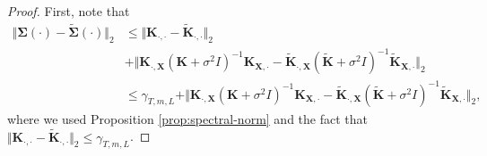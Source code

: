 \begin{proof}
    


First, note that
\begin{align*}
    \Vert \boldsymbol{\Sigma}(\cdot)-\tilde{\boldsymbol{\Sigma}}(\cdot)\Vert_2 &\leq \Vert \textbf{K}_{\cdot,\cdot}-\tilde{\textbf{K}}_{\cdot,\cdot}\Vert_2\\
    &+ \Vert \textbf{K}_{\cdot,\textbf{X}} (\textbf{K}+\sigma^2 I)^{-1}\textbf{K}_{\textbf{X},\cdot}-\tilde{\textbf{K}}_{\cdot,\textbf{X}} (\tilde{\textbf{K}}+\sigma^2 I)^{-1}\tilde{\textbf{K}}_{\textbf{X},\cdot}\Vert_2 \\
    &\leq \gamma_{T,m,L} + \Vert \textbf{K}_{\cdot,\textbf{X}} (\textbf{K}+\sigma^2 I)^{-1}\textbf{K}_{\textbf{X},\cdot}-\tilde{\textbf{K}}_{\cdot,\textbf{X}} (\tilde{\textbf{K}}+\sigma^2 I)^{-1}\tilde{\textbf{K}}_{\textbf{X},\cdot}\Vert_2,
\end{align*}
where we used Proposition \ref{prop:spectral-norm} and the fact that $\Vert \textbf{K}_{\cdot,\cdot}-\tilde{\textbf{K}}_{\cdot,\cdot}\Vert_2 \leq \gamma_{T,m,L}$.


\end{proof}
